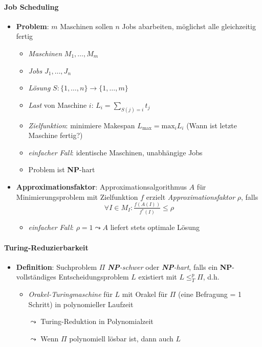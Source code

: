 \paragraph{Job Scheduling}
\begin{itemize}
  \item \textbf{Problem}: $ m $ Maschinen sollen $ n $ Jobs abarbeiten, möglichst alle gleichzeitig fertig
  \begin{itemize}
    \item \emph{Maschinen} $ M_1, \dots, M_m $
    \item \emph{Jobs} $ J_1, \dots, J_n $
    \item \emph{Lösung} $ S: \{ 1,\dots,n \} \to \{ 1,\dots,m \} $
    \item \emph{Last} von Maschine $ i $: $ L_i = \sum_{S(j) = i}t_j $
    \item \emph{Zielfunktion}: minimiere Makespan $ L_\text{max} = \text{max}_iL_i $ (Wann ist letzte Maschine fertig?)
    \item \emph{einfacher Fall}: identische Maschinen, unabhängige Jobs
    \item Problem ist \textbf{NP}-hart
  \end{itemize}
  \item \textbf{Approximationsfaktor}: Approximationsalgorithmus $ A $ für Minimierungsproblem mit Zielfunktion $ f $ erzielt \emph{Approximationsfaktor} $ \rho $, falls
  \begin{equation*}
    \forall I \in M_I : \tfrac{f(A(I))}{f^*(I)} \leq \rho
  \end{equation*}
  \begin{itemize}
    \item \emph{einfacher Fall}: $ \rho = 1 \leadsto A $ liefert stets optimale Lösung
  \end{itemize}
\end{itemize}

\paragraph{Turing-Reduzierbarkeit}
\begin{itemize}
  \item \textbf{Definition}: Suchproblem $ \Pi $ \emph{\textbf{NP}-schwer} oder \emph{\textbf{NP}-hart}, falls ein \textbf{NP}-vollständiges Entscheidungsproblem $ L $ existiert mit $ L \leq_T^p \Pi $, d.h.
  \begin{itemize}
    \item \emph{Orakel-Turingmaschine} für $ L $ mit Orakel für $ \Pi $ (eine Befragung = 1 Schritt) in polynomieller Laufzeit
    \item[$ \leadsto $] Turing-Reduktion in Polynomialzeit
    \item[$ \leadsto $] Wenn $ \Pi $ polynomiell lösbar ist, dann auch $ L $
  \end{itemize}
\end{itemize}

